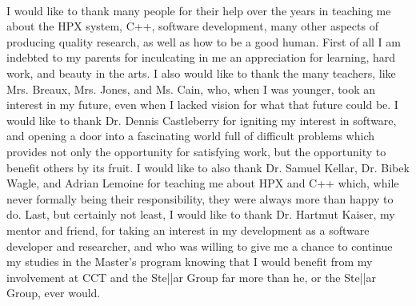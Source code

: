 \label{acknowledgement}
\paragraph{}
I would like to thank many people for their help over the years in teaching me about the HPX system, C++, software development, many other aspects of producing quality research, as well as how to be a good human. First of all I am indebted to my parents for inculcating in me an appreciation for learning, hard work, and beauty in the arts. I also would like to thank the many teachers, like Mrs. Breaux, Mrs. Jones, and Ms. Cain, who, when I was younger, took an interest in my future, even when I lacked vision for what that future could be. I would like to thank Dr. Dennis Castleberry for igniting my interest in software, and opening a door into a fascinating world full of difficult problems which provides not only the opportunity for satisfying work, but the opportunity to benefit others by its fruit. I would like to also thank Dr. Samuel Kellar, Dr. Bibek Wagle, and Adrian Lemoine for teaching me about HPX and C++ which, while never formally being their responsibility, they were always more than happy to do. Last, but certainly not least, I would like to thank Dr. Hartmut Kaiser, my mentor and friend, for taking an interest in my development as a software developer and researcher, and who was willing to give me a chance to continue my studies in the Master's program knowing that I would benefit from my involvement at CCT and the Ste||ar Group far more than he, or the Ste||ar Group, ever would.

